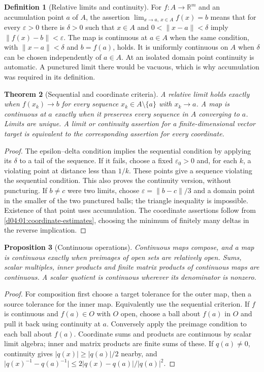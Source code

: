 \documentclass[11pt,oneside,openany]{book}
\newtheorem{theorem}{Theorem}[chapter]
\newtheorem{proposition}[theorem]{Proposition}
\theoremstyle{definition}
\newtheorem{definition}[theorem]{Definition}
\theoremstyle{remark}
\newcommand{\R}{\mathbb R}
\newcommand{\eps}{\varepsilon}
\newcommand{\abs}[1]{\lvert#1\rvert}
\newcommand{\norm}[1]{\lVert#1\rVert}
\begin{document}
\begin{definition}[Relative limits and continuity]\label{d04:01:limits}
For $f:A\to\R^m$ and an accumulation point $a$ of $A$, the assertion
$\lim_{x\to a,\ x\in A}f(x)=b$ means that for every $\eps>0$ there is
$\delta>0$ such that $x\in A$ and $0<\norm{x-a}<\delta$ imply
$\norm{f(x)-b}<\eps$. The map is continuous at $a\in A$ when the same
condition, with $\norm{x-a}<\delta$ and $b=f(a)$, holds. It is uniformly
continuous on $A$ when $\delta$ can be chosen independently of $a\in A$.
At an isolated domain point continuity is automatic. A punctured limit there
would be vacuous, which is why accumulation was required in its definition.
\end{definition}

\begin{theorem}[Sequential and coordinate criteria]\label{d04:01:sequential-continuity}
A relative limit holds exactly when $f(x_k)\to b$ for every sequence
$x_k\in A\setminus\{a\}$ with $x_k\to a$. A map is continuous at $a$
exactly when it preserves every sequence in $A$ converging to $a$. Limits are
unique. A limit or continuity assertion for a finite-dimensional vector target
is equivalent to the corresponding assertion for every coordinate.
\end{theorem}
\begin{proof}
The epsilon--delta condition implies the sequential condition by applying its
$\delta$ to a tail of the sequence. If it fails, choose a fixed
$\eps_0>0$ and, for each $k$, a violating point at distance less than $1/k$.
These points give a sequence violating the sequential condition. This also
proves the continuity version, without puncturing. If $b\ne c$ were two
limits, choose $\eps=\norm{b-c}/3$ and a domain point in the smaller of
the two punctured balls; the triangle inequality is impossible. Existence of
that point uses accumulation. The coordinate assertions follow from
\cref{d04:01:coordinate-estimates}, choosing the minimum of finitely many
deltas in the reverse implication.
\end{proof}

\begin{proposition}[Continuous operations]\label{d04:01:continuous-operations}
Continuous maps compose, and a map is continuous exactly when preimages of
open sets are relatively open. Sums, scalar multiples, inner products and
finite matrix products of continuous maps are continuous. A scalar quotient
is continuous wherever its denominator is nonzero.
\end{proposition}
\begin{proof}
For composition first choose a target tolerance for the outer map, then a
source tolerance for the inner map. Equivalently use the sequential criterion.
If $f$ is continuous and $f(a)\in O$ with $O$ open, choose a ball about
$f(a)$ in $O$ and pull it back using continuity at $a$. Conversely apply
the preimage condition to each ball about $f(a)$. Coordinate sums and products
are continuous by scalar limit algebra; inner and matrix products are finite
sums of these. If $q(a)\ne0$, continuity gives
$\abs{q(x)}\geq\abs{q(a)}/2$ nearby, and
$\abs{q(x)^{-1}-q(a)^{-1}}\leq2\abs{q(x)-q(a)}/\abs{q(a)}^2$.
\end{proof}
\end{document}
